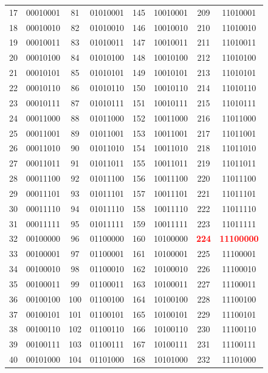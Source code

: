 \documentclass[a4paper,12pt]{report}
\begin{document}
{\begin{center}
\begin{tabular}{|c|c||c|c||c|c||c|c|}
17 & 00010001 & 81 & 01010001 & 145 & 10010001 & 209 & 11010001 \\
18 & 00010010 & 82 & 01010010 & 146 & 10010010 & 210 & 11010010 \\
19 & 00010011 & 83 & 01010011 & 147 & 10010011 & 211 & 11010011 \\
20 & 00010100 & 84 & 01010100 & 148 & 10010100 & 212 & 11010100 \\
21 & 00010101 & 85 & 01010101 & 149 & 10010101 & 213 & 11010101 \\
22 & 00010110 & 86 & 01010110 & 150 & 10010110 & 214 & 11010110 \\
23 & 00010111 & 87 & 01010111 & 151 & 10010111 & 215 & 11010111 \\
24 & 00011000 & 88 & 01011000 & 152 & 10011000 & 216 & 11011000 \\
25 & 00011001 & 89 & 01011001 & 153 & 10011001 & 217 & 11011001 \\
26 & 00011010 & 90 & 01011010 & 154 & 10011010 & 218 & 11011010 \\
27 & 00011011 & 91 & 01011011 & 155 & 10011011 & 219 & 11011011 \\
28 & 00011100 & 92 & 01011100 & 156 & 10011100 & 220 & 11011100 \\
29 & 00011101 & 93 & 01011101 & 157 & 10011101 & 221 & 11011101 \\
30 & 00011110 & 94 & 01011110 & 158 & 10011110 & 222 & 11011110 \\
31 & 00011111 & 95 & 01011111 & 159 & 10011111 & 223 & 11011111 \\
32 & 00100000 & 96 & 01100000 & 160 & 10100000 & \textbf{\textcolor{red}{224}} & \textbf{\textcolor{red}{11100000}} \\
33 & 00100001 & 97 & 01100001 & 161 & 10100001 & 225 & 11100001 \\
34 & 00100010 & 98 & 01100010 & 162 & 10100010 & 226 & 11100010 \\
35 & 00100011 & 99 & 01100011 & 163 & 10100011 & 227 & 11100011 \\
36 & 00100100 & 100 & 01100100 & 164 & 10100100 & 228 & 11100100 \\
37 & 00100101 & 101 & 01100101 & 165 & 10100101 & 229 & 11100101 \\
38 & 00100110 & 102 & 01100110 & 166 & 10100110 & 230 & 11100110 \\
39 & 00100111 & 103 & 01100111 & 167 & 10100111 & 231 & 11100111 \\
40 & 00101000 & 104 & 01101000 & 168 & 10101000 & 232 & 11101000 \\

\end{tabular}
\end{center}}
\end{document}
